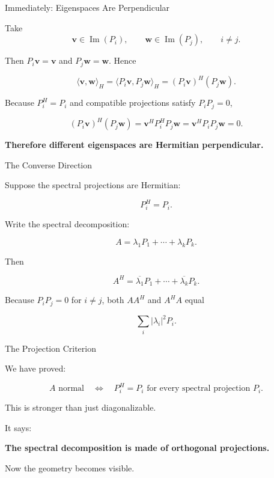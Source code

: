 \documentclass[10pt]{beamer}
\theoremstyle{definition}
\newcommand{\x}[1]{\alert{\textbf{#1}}}
\begin{document}
\begin{frame}[shrink=6]{Immediately: Eigenspaces Are Perpendicular}

Take
$$
\mathbf v\in \operatorname{Im}(P_i),
\qquad
\mathbf w\in \operatorname{Im}(P_j),
\qquad i\ne j.
$$

\vfill\pause

Then $P_i\mathbf v=\mathbf v$ and $P_j\mathbf w=\mathbf w$. Hence

$$
\langle \mathbf v,\mathbf w\rangle_H
=\langle P_i\mathbf v,P_j\mathbf w\rangle_H
=(P_i\mathbf v)^H(P_j\mathbf w).
$$

\vfill\pause

Because $P_i^H=P_i$ and compatible projections satisfy $P_iP_j=0$,

$$
(P_i\mathbf v)^H(P_j\mathbf w)
=\mathbf v^HP_i^HP_j\mathbf w
=\mathbf v^HP_iP_j\mathbf w
=0.
$$

\vfill

\x{Therefore different eigenspaces are Hermitian perpendicular.}

\end{frame}


\begin{frame}[shrink=5]{The Converse Direction}

Suppose the spectral projections are Hermitian:

$$
P_i^H=P_i.
$$

\vfill

Write the spectral decomposition:

$$
A=\lambda_1P_1+\cdots+\lambda_kP_k.
$$

\vfill\pause

Then

$$
A^H=\overline{\lambda_1}P_1+\cdots+\overline{\lambda_k}P_k.
$$

\vfill

Because $P_iP_j=0$ for $i\ne j$, both $AA^H$ and $A^HA$ equal

$$
\sum_i |\lambda_i|^2P_i.
$$

\end{frame}


\begin{frame}{The Projection Criterion}

We have proved:

$$
\boxed{
A\text{ normal}
\quad\Longleftrightarrow\quad
P_i^H=P_i\text{ for every spectral projection }P_i.
}
$$

\vfill\pause

This is stronger than just diagonalizable.

\vfill

It says:

\begin{center}
\x{The spectral decomposition is made of orthogonal projections.}
\end{center}

\vfill

Now the geometry becomes visible.

\end{frame}
\end{document}
